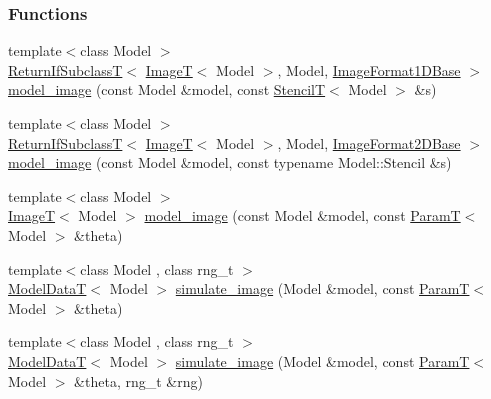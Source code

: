 \subsubsection*{Functions}
\begin{DoxyCompactItemize}
\item 
{\footnotesize template$<$class Model $>$ }\\\hyperlink{namespacemappel_a3b77d227658ba3ba9e16fea6fa6e626d}{Return\+If\+SubclassT}$<$ \hyperlink{namespacemappel_a14658186b77757f3c35a69cb1be6cf4b}{ImageT}$<$ Model $>$, Model, \hyperlink{classmappel_1_1ImageFormat1DBase}{Image\+Format1\+D\+Base} $>$ \hyperlink{namespacemappel_1_1methods_ae92825adbc9f0eea36c2b0afdbf40d66}{model\+\_\+image} (const Model \&model, const \hyperlink{namespacemappel_a3a06598240007876f8c4bf834ad86197}{StencilT}$<$ Model $>$ \&s)
\item 
{\footnotesize template$<$class Model $>$ }\\\hyperlink{namespacemappel_a3b77d227658ba3ba9e16fea6fa6e626d}{Return\+If\+SubclassT}$<$ \hyperlink{namespacemappel_a14658186b77757f3c35a69cb1be6cf4b}{ImageT}$<$ Model $>$, Model, \hyperlink{classmappel_1_1ImageFormat2DBase}{Image\+Format2\+D\+Base} $>$ \hyperlink{namespacemappel_1_1methods_a864e97c52c849c580bccf04401695d13}{model\+\_\+image} (const Model \&model, const typename Model\+::\+Stencil \&s)
\item 
{\footnotesize template$<$class Model $>$ }\\\hyperlink{namespacemappel_a14658186b77757f3c35a69cb1be6cf4b}{ImageT}$<$ Model $>$ \hyperlink{namespacemappel_1_1methods_a4243465f0e58305d795497cbb0499433}{model\+\_\+image} (const Model \&model, const \hyperlink{namespacemappel_a667925cb0d6c0e49f2f035cc5a9a6857}{ParamT}$<$ Model $>$ \&theta)
\item 
{\footnotesize template$<$class Model , class rng\+\_\+t $>$ }\\\hyperlink{namespacemappel_a97f050df953605381ae9c901c3b125f1}{Model\+DataT}$<$ Model $>$ \hyperlink{namespacemappel_1_1methods_a950d7858d6cc0ffb6e651776a24c9e35}{simulate\+\_\+image} (Model \&model, const \hyperlink{namespacemappel_a667925cb0d6c0e49f2f035cc5a9a6857}{ParamT}$<$ Model $>$ \&theta)
\item 
{\footnotesize template$<$class Model , class rng\+\_\+t $>$ }\\\hyperlink{namespacemappel_a97f050df953605381ae9c901c3b125f1}{Model\+DataT}$<$ Model $>$ \hyperlink{namespacemappel_1_1methods_a74ba8d927de2e6fad2fec49599d4429e}{simulate\+\_\+image} (Model \&model, const \hyperlink{namespacemappel_a667925cb0d6c0e49f2f035cc5a9a6857}{ParamT}$<$ Model $>$ \&theta, rng\+\_\+t \&rng)

\end{DoxyCompactItemize}
